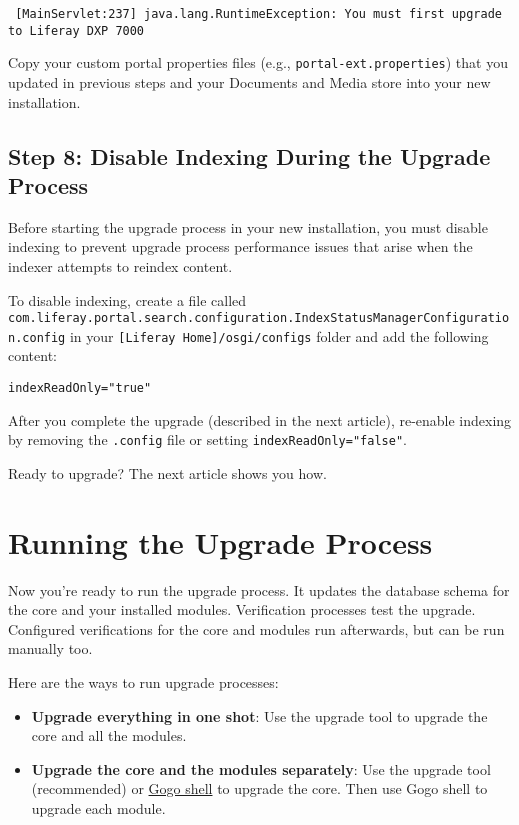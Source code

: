 \begin{verbatim}
 [MainServlet:237] java.lang.RuntimeException: You must first upgrade to Liferay DXP 7000
\end{verbatim}

\noindent\hrulefill

Copy your custom portal properties files (e.g.,
\texttt{portal-ext.properties}) that you updated in previous steps and
your Documents and Media store into your new installation.

\subsection{Step 8: Disable Indexing During the Upgrade
Process}\label{step-8-disable-indexing-during-the-upgrade-process}

Before starting the upgrade process in your new installation, you must
disable indexing to prevent upgrade process performance issues that
arise when the indexer attempts to reindex content.

To disable indexing, create a file called
\texttt{com.liferay.portal.search.configuration.IndexStatusManagerConfiguration.config}
in your \texttt{{[}Liferay\ Home{]}/osgi/configs} folder and add the
following content:

\begin{verbatim}
indexReadOnly="true"
\end{verbatim}

After you complete the upgrade (described in the next article),
re-enable indexing by removing the \texttt{.config} file or setting
\texttt{indexReadOnly="false"}.

Ready to upgrade? The next article shows you how.

\section{Running the Upgrade
Process}\label{running-the-upgrade-process}

Now you're ready to run the upgrade process. It updates the database
schema for the core and your installed modules. Verification processes
test the upgrade. Configured verifications for the core and modules run
afterwards, but can be run manually too.

Here are the ways to run upgrade processes:

\begin{itemize}
\item
  \textbf{Upgrade everything in one shot}: Use the upgrade tool to
  upgrade the core and all the modules.
\item
  \textbf{Upgrade the core and the modules separately}: Use the upgrade
  tool (recommended) or
  \hyperref[gogo-shell-commands-for-module-upgrades]{Gogo shell} to
  upgrade the core. Then use Gogo shell to upgrade each module.
\end{itemize}

